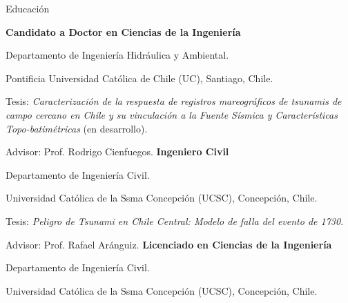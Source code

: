 \begin{rubric}{Educación}

\entry*[Desde  2015]%
	\textbf{Candidato a Doctor en Ciencias de la Ingeniería}
	\par Departamento de Ingeniería Hidráulica y Ambiental.
	 \par Pontificia Universidad Cat\'olica de Chile (UC), Santiago, Chile.
	 \par Tesis: \emph{Caracterización de la respuesta de registros mareográficos de tsunamis de campo cercano en Chile y su vinculación a la Fuente Sísmica y Características Topo-batimétricas} (en desarrollo).
	 \par Advisor: Prof. Rodrigo Cienfuegos.
%
\entry*[2008 -- 2015]%
	\textbf{Ingeniero Civil}
	\par Departamento de Ingeniería Civil.
	 \par Universidad Cat\'olica de la Ssma Concepci\'on (UCSC), Concepci\'on, Chile.
	 \par Tesis: \emph{Peligro de Tsunami en Chile Central: Modelo de falla del evento de 1730}.
	 \par Advisor: Prof. Rafael Ar\'anguiz.
%
\entry*[2008 -- 2012]%
	\textbf{Licenciado en Ciencias de la Ingeniería}
	\par Departamento de Ingeniería Civil.
	\par Universidad Cat\'olica de la Ssma Concepci\'on (UCSC), Concepci\'on, Chile. %
\end{rubric}

